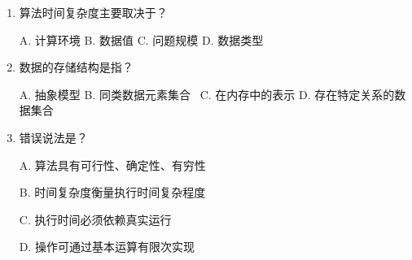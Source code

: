 \documentclass[lang=cn,newtx,10pt,scheme=chinese]{elegantbook}
\begin{document}
\begin{enumerate}
    \item 算法时间复杂度主要取决于？\
   
    A. 计算环境 \quad B. 数据值 \quad C. 问题规模 \quad D. 数据类型

    \item 数据的存储结构是指？\
    
    A. 抽象模型 \quad B. 同类数据元素集合 \
    C. 在内存中的表示 \quad D. 存在特定关系的数据集合

    \item 错误说法是？\
   
    A. 算法具有可行性、确定性、有穷性 \

    B. 时间复杂度衡量执行时间复杂程度 \

    C. 执行时间必须依赖真实运行 \

    D. 操作可通过基本运算有限次实现
\end{enumerate}
\end{document}
